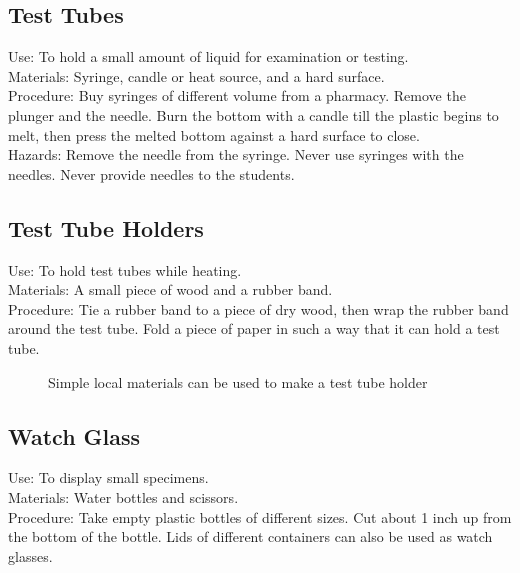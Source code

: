 \subsection*{Test Tubes}


Use: To hold a small amount of liquid for examination or testing.\\
Materials: Syringe, candle or heat source, and a hard surface.\\
Procedure: Buy syringes of different volume from a pharmacy. Remove the plunger and the needle. Burn the bottom with a candle till the plastic begins to melt, then press the melted bottom against a hard surface to close.\\
Hazards: Remove the needle from the syringe. Never use syringes with the needles. Never provide needles to the students.\\


\subsection*{Test Tube Holders}


Use: To hold test tubes while heating.\\
Materials: A small piece of wood and a rubber band.\\
Procedure: Tie a rubber band to a piece of dry wood, then wrap the rubber band around the test tube. Fold a piece of paper in such a way that it can hold a test tube.\\

\begin{figure}[H]
\begin{center}
\def\svgwidth{4cm}

\caption{Simple local materials can be used to make a test tube holder}
\label{fig:tube-holder}
\end{center}
\end{figure}


\subsection*{Watch Glass}


Use: To display small specimens.\\
Materials: Water bottles and scissors.\\
Procedure: Take empty plastic bottles of different sizes. Cut about 1 inch up from the bottom of the bottle. Lids of different containers can also be used as watch glasses.\\


